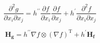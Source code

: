 	\begin{equation}
	\frac{\partial^2 g}{\partial x_i \partial x_j} = h^{\prime\prime} \frac{\partial f}{\partial x_i}\frac{\partial f}{\partial x_j} + h^{\prime} \frac{\partial^2 f}{\partial x_i\partial x_j}
	\end{equation}
	
	\begin{equation}
	\mathbf{H_g} = h^{\prime\prime} \nabla f \otimes (\nabla f)^\text{T} + h^{\prime} \mathbf{H_f}
	\end{equation}
	
	


